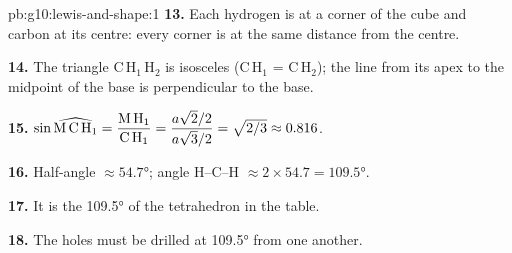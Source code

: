 \begin{solution}{pb:g10:lewis-and-shape:1}
\textbf{13.} Each hydrogen is at a corner of the cube and carbon at its
centre: every corner is at the same distance from the centre.

\textbf{14.} The triangle C\,H$_1$\,H$_2$ is isosceles (C\,H$_1$ = C\,H$_2$);
the line from its apex to the midpoint of the base is perpendicular to the
base.

\textbf{15.} $\sin \widehat{\text{M\,C\,H}_1} = \dfrac{\text{M\,H}_1}{\text{C\,H}_1}
= \dfrac{a\sqrt{2}/2}{a\sqrt{3}/2} = \sqrt{2/3} \approx 0.816$.

\textbf{16.} Half-angle $\approx \ang{54.7}$; angle H--C--H $\approx
2 \times 54.7 = \ang{109.5}$.

\textbf{17.} It is the \ang{109.5} of the tetrahedron in the table.

\textbf{18.} The holes must be drilled at \ang{109.5} from one another.
\end{solution}
